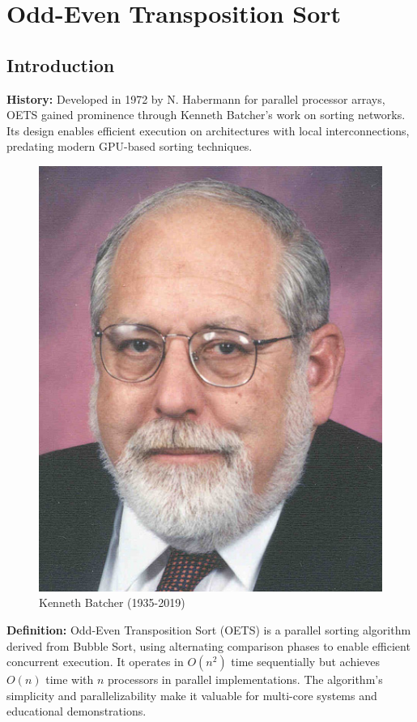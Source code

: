 \section{Odd-Even Transposition Sort}

\subsection{Introduction}
\textbf{History:} Developed in 1972 by N. Habermann for parallel processor arrays, OETS gained prominence through Kenneth Batcher's work on sorting networks. Its design enables efficient execution on architectures with local interconnections, predating modern GPU-based sorting techniques.

\begin{figure}[H]
\centering
\includegraphics[scale = 0.5]{img/kennethEBatcher.jpg}
\caption{Kenneth Batcher (1935-2019)}
\label{fig:batcher}
\end{figure}

\textbf{Definition:} Odd-Even Transposition Sort (OETS) is a parallel sorting algorithm derived from Bubble Sort, using alternating comparison phases to enable efficient concurrent execution. It operates in $O(n^2)$ time sequentially but achieves $O(n)$ time with $n$ processors in parallel implementations. The algorithm's simplicity and parallelizability make it valuable for multi-core systems and educational demonstrations.

